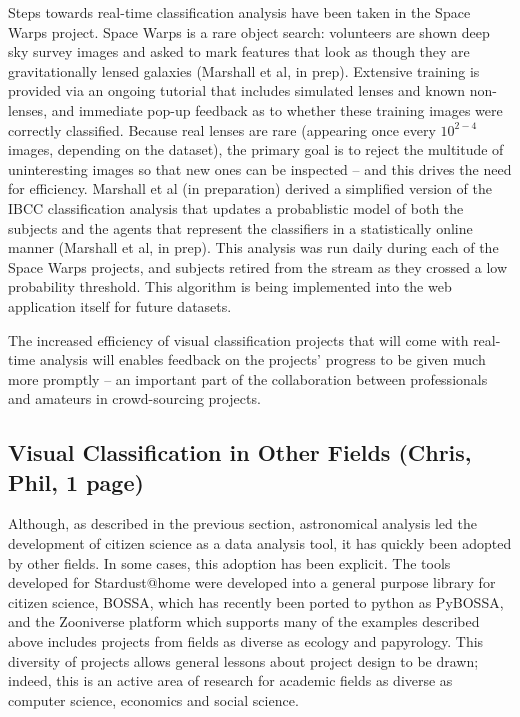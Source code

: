 \documentclass{ar2e}
\begin{document}
Steps towards real-time classification analysis have been taken in the Space
Warps project. Space Warps is a rare object search: volunteers are shown deep
sky survey images and asked to mark features that look as though they are
gravitationally lensed galaxies (Marshall et al, in prep). Extensive training is
provided via an ongoing tutorial that includes simulated lenses and known
non-lenses, and immediate pop-up feedback as to whether these training images
were correctly classified. Because real lenses are rare (appearing once every
$10^{2-4}$ images, depending on the dataset), the primary goal is to reject the
multitude of uninteresting images so that new ones can be inspected -- and this
drives the need for efficiency. Marshall et al (in preparation) derived a
simplified version of the IBCC classification analysis that updates a
probablistic model of both the subjects and the agents that represent the
classifiers in a statistically online manner (Marshall et al, in prep). This
analysis was run daily during each of the Space Warps projects, and subjects
retired from the stream as they crossed a low probability threshold. This
algorithm is being implemented into the web application itself for future
datasets. 

The increased  efficiency of visual classification projects that will come with
real-time analysis will enables feedback on the projects' progress to be given
much more promptly -- an important part of the collaboration between
professionals and amateurs in crowd-sourcing projects.



\subsection{Visual Classification in Other Fields (\textbf{Chris}, Phil, 1 page)}
\label{sec:class:non-astro}

Although, as described in the previous section, astronomical analysis led the
development of citizen science as a data analysis tool, it has quickly been
adopted by other fields. In some cases, this adoption has been explicit. The
tools developed for Stardust@home were developed into a general purpose
library for citizen science, BOSSA, which has recently been ported to python
as PyBOSSA, and the Zooniverse platform which supports many of the examples
described above includes projects from fields as diverse as ecology and
papyrology. This diversity of projects allows general lessons about project
design to be drawn; indeed, this is an active area of research for academic
fields as diverse as computer science, economics and social science. 
\end{document}
